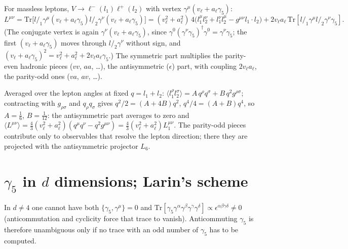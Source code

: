 \documentclass[11pt,a4paper]{article}
\newcommand{\gf}{\gamma_5}
\newcommand{\sla}[1]{#1\!\!\!/}
\newcommand{\tr}{\mathrm{Tr}}
\begin{document}
For massless leptons, $V\to\ell^-(l_1)\ell^+(l_2)$ with vertex $\gamma^\mu(v_\ell+a_\ell\gf)$:
\begin{equation}
L^{\mu\nu}=\tr\big[\sla{l}_1\gamma^\mu(v_\ell+a_\ell\gf)\sla{l}_2\gamma^\nu(v_\ell+a_\ell\gf)\big]
=(v_\ell^2+a_\ell^2)\,4\big(l_1^\mu l_2^\nu+l_1^\nu l_2^\mu-g^{\mu\nu}l_1\!\cdot l_2\big)
+2v_\ell a_\ell\,\tr[\sla l_1\gamma^\mu\sla l_2\gamma^\nu\gf].
\end{equation}
(The conjugate vertex is again $\gamma^\nu(v_\ell+a_\ell\gf)$, since $\gamma^0(\gamma^\nu\gf)^\dagger\gamma^0=\gamma^\nu\gf$; the first
$(v_\ell+a_\ell\gf)$ moves through $\sla l_2\gamma^\nu$ without sign, and $(v_\ell+a_\ell\gf)^2=v_\ell^2+a_\ell^2+2v_\ell a_\ell\gf$.)
The symmetric part multiplies the parity-even hadronic pieces ($vv$, $aa$, \dots), the antisymmetric ($\epsilon$) part,
with coupling $2v_\ell a_\ell$, the parity-odd ones ($va$, $av$, \dots).

Averaged over the lepton angles at fixed $q=l_1+l_2$: $\langle l_1^\rho l_2^\sigma\rangle=A\,q^\rho q^\sigma+B\,q^2g^{\rho\sigma}$;
contracting with $g_{\rho\sigma}$ and $q_\rho q_\sigma$ gives $q^2/2=(A+4B)q^2$, $q^4/4=(A+B)q^4$, so $A=\tfrac16$, $B=\tfrac1{12}$:
the antisymmetric part averages to zero and
$\langle L^{\mu\nu}\rangle=\tfrac43(v_\ell^2+a_\ell^2)(q^\mu q^\nu-q^2g^{\mu\nu})=\tfrac43(v_\ell^2+a_\ell^2)L_1^{\mu\nu}$.
The parity-odd pieces contribute only to observables that resolve the lepton direction; there they are projected with
the antisymmetric projector $L_6$.

\section{\texorpdfstring{$\gamma_5$}{gamma5} in \texorpdfstring{$d$}{d} dimensions; Larin's scheme}\label{sec:g5}

In $d\neq4$ one cannot have both $\{\gf,\gamma^\mu\}=0$ and $\tr[\gf\gamma^\alpha\gamma^\beta\gamma^\gamma\gamma^\delta]\propto\epsilon^{\alpha\beta\gamma\delta}\neq0$
(anticommutation and cyclicity force that trace to vanish). Anticommuting $\gf$ is therefore unambiguous only if no
trace with an odd number of $\gf$ has to be computed.
\end{document}
